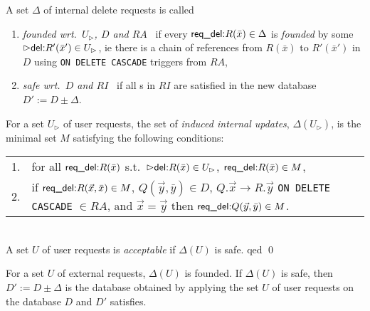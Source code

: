\documentclass[twoside,11pt]{article}
\theoremstyle{lines}
\theoremstyle{longplain}
\def\rdel{\itorsf{req\_del:}}
\begin{document}
\begin{Definition}
  A set $\Delta$ of internal delete requests is called
  \begin{enumerate}
  \item \emph{founded wrt.\ $U_\rhd$, $D$ and $RA$}~
    if every $\rdel R(\bar x)\in \Delta$ is \emph{founded} by some 
    $\extev \del R'(\bar x') \in U_\rhd$, ie there is a chain of
    references from $R(\bar x)$ to $R'(\bar x')$ in $D$ using
    \texttt{ON DELETE CASCADE} triggers from $RA$,
  \item \emph{safe wrt.\ $D$ and $RI$}~ if
    all \ric s in $RI$ are satisfied in the new database 
    $D':=D \pm \Delta$.
  \end{enumerate}
  For a set $U_\rhd$ of user requests, the set of \emph{induced
  internal updates}, $\Delta(U_\rhd)$, is the minimal set $M$
  satisfying the following conditions: \\
\restwidth\textwidth \advance\restwidth-1cm
\begin{tabular}[t]{lp{\restwidth}}
  1.& for all $\rdel R(\bar x)$ s.t.\ 
     $\extev \del R(\bar x) \in U_\rhd$, 
     $\rdel R(\bar x) \in M$, \\
  2.& if $\rdel R(\vec x,\bar x) \in M$, $Q(\vec y,\bar y) \in D$, 
     $Q.\vec x \to R.\vec y$ \texttt{ON DELETE CASCADE} $\in RA$,
     and $\vec x = \vec y$ then 
     $\rdel Q(\vec y,\bar y) \in M$. 
\end{tabular} \\
%
A set $U$ of user requests is \emph{acceptable} if $\Delta(U)$
is safe.     \hfill qed \qed
\end{Definition}

\begin{Lemma}
  For a set $U$ of external requests, $\Delta(U)$ is founded. If 
  $\Delta(U)$ is safe, then $D' := D \pm \Delta$ is the database
  obtained by applying the set $U$ of user requests on the database
  $D$ and $D'$ satisfies.
\end{Lemma}
\end{document}
